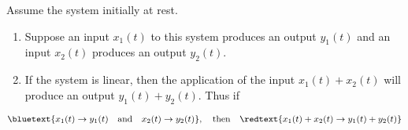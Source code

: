 \documentclass[../notes-main.tex]{subfiles}
\begin{document}
\subsubsection{} Assume the system initially at rest.
\begin{enumerate}[label=\blacktriangleright, leftmargin=*, itemsep=0.5em]
    \item Suppose an input \(x_1(t)\) to this system produces an output \(y_1(t)\) and an input \(x_2(t)\) produces an output \(y_2(t)\).
    \item If the system is linear, then the application of the input \(x_1(t) + x_2(t)\) will produce an output \(y_1(t) + y_2(t)\). Thus if
\end{enumerate}
\begin{equation}
    \bluetext{x_1(t) \rightarrow y_1(t) \quad \text{and} \quad x_2(t) \rightarrow y_2(t)}, \quad \text{then} \quad \redtext{x_1(t) + x_2(t) \rightarrow y_1(t) + y_2(t)}
    \label{eq:linear-system-additive-property-equation}
\end{equation}
\end{document}
